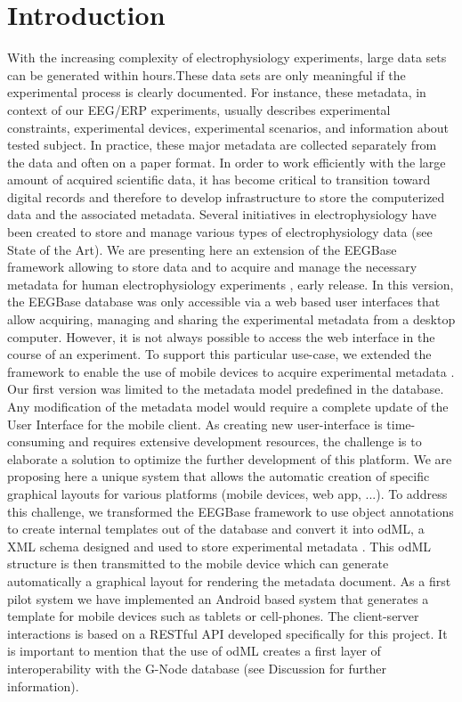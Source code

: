 \documentclass[conference]{IEEEtran}
\begin{document}
\section{Introduction}\label{Introduction}

With the increasing complexity of electrophysiology experiments, large data sets can be generated within hours.These data sets are only meaningful if the experimental process is clearly documented. For instance, these metadata, in context of our EEG/ERP experiments, usually describes experimental constraints, experimental devices, experimental scenarios, and information about tested subject. In practice, these major metadata are collected separately from the data and often on a paper format. In order to work efficiently with the large amount of acquired scientific data, it has become critical to transition toward digital records and therefore to develop infrastructure to store the computerized data and the associated metadata. Several initiatives in electrophysiology have been created to store and manage various types of electrophysiology data (see State of the Art). We are presenting here an extension of the EEGBase framework allowing to store data and to acquire and manage the necessary metadata for human electrophysiology experiments \cite{ISI:000306821100004}, early release. 
In this version, the EEGBase database was only accessible via a web based user interfaces that allow acquiring, managing and sharing the experimental metadata from a desktop computer. However, it is not always possible to access the web interface in the course of an experiment. To support this particular use-case, we extended the framework to enable the use of mobile devices to acquire experimental metadata \cite{10.3389/fninf.2014.00020}. Our first version was limited to the metadata model predefined in the database. Any modification of the metadata model would require a complete update of the User Interface for the mobile client. 
As creating new user-interface is time-consuming and requires extensive development resources, the challenge is to elaborate a solution to optimize the further development of this platform. We are proposing here a unique system that allows the automatic creation of specific graphical layouts for various platforms (mobile devices, web app, ...). To address this challenge, we transformed the EEGBase framework to use object annotations \cite{6645264} to create internal templates out of the database and convert it into odML, a XML schema designed and used to store experimental metadata \cite{10.3389/fninf.2011.00016}. This odML structure is then transmitted to the mobile device which can generate automatically a graphical layout for rendering the metadata document. As a first pilot system we have implemented an Android based system that generates a template for mobile devices such as tablets or cell-phones. The client-server interactions is based on a RESTful API developed specifically for this project. 
It is important to mention that the use of odML creates a first layer of interoperability with the G-Node database (see Discussion for further information).
\end{document}
